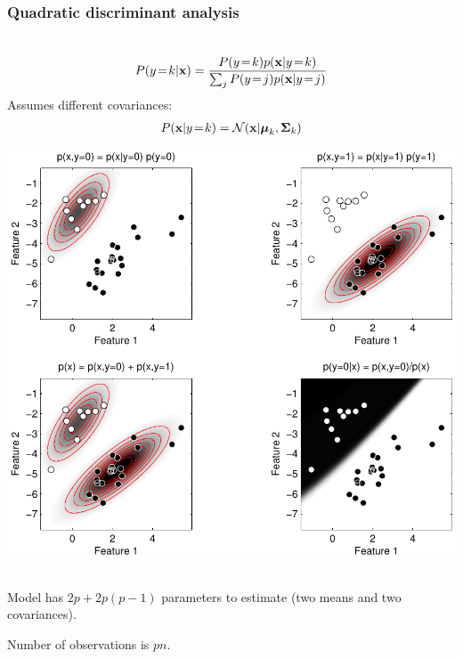 \begin{frame}
\frametitle{Quadratic discriminant analysis}
\begin{columns}[c]
\begin{align*}
P(y\!=\!k|{\bf x}) = \frac{P(y\!=\!k) p({\bf x}|y\!=\!k)}{\sum_j P(y\!=\!j) p({\bf x}|y\!=\!j)}
\end{align*}
Assumes different covariances:
\begin{align*}
P({\bf x}|y\!=\!k) = \mathcal{N}({\bf x} | {\boldsymbol\mu}_k, {\boldsymbol\Sigma}_k)
\end{align*}
\includegraphics[width=\textwidth]{simple_qda}
\end{columns}
Model has $2p + 2p(p-1)$ parameters to estimate (two means and two covariances).\par
Number of observations is $pn$.
\end{frame}


